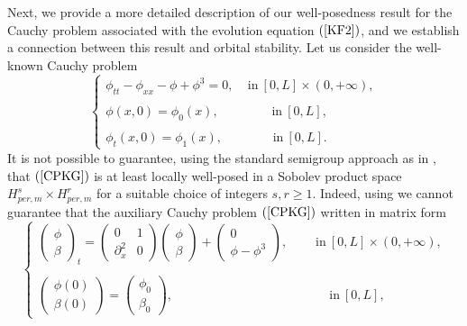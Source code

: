 \documentclass[12pt,reqno,a4paper]{amsart} %
\numberwithin{equation}{section}
\numberwithin{figure}{section}
\begin{document}
\indent Next, we provide a more detailed description of our well-posedness result for the Cauchy problem associated with the evolution equation $(\ref{KF2})$, and we establish a connection between this result and orbital stability.  Let us consider the well-known Cauchy problem
   \begin{equation}\label{CPKG}
\left\{\begin{array}{llll}
\phi_{tt}-\phi_{xx}-\phi+\phi^3=0, \:\:\:\: \:\text{in} \: [0,L]\times(0,+\infty), \\\\
\phi(x,0)=\phi_0(x),\:\:\:\:\:\:\:\:\:\:\:\:\:\:\:\:\:\:\: \text{in} \: [0,L],\\\\
\phi_t(x,0)= \phi_1(x),\:\:\:\:\:\:\:\:\:\:\:\:\:\:\:\:\:\: \text{in} \: [0,L].
\end{array}\right.
\end{equation}
It is not possible to guarantee, using the standard semigroup approach as in \cite{pazy}, that $(\ref{CPKG})$ is at least locally well-posed in a Sobolev product space $H_{per,m}^s\times H_{per,m}^r$ for a suitable choice of integers $s,r\geq1$. Indeed, using \cite{pazy} we cannot guarantee that the auxiliary Cauchy problem 
$(\ref{CPKG})$ written in matrix form 
\begin{equation}\label{CPKG1}
\begin{cases}
	\left(\begin{array}{lll}\phi\\\beta\end{array}\right)_t
	=\left(\begin{array}{lll}0&  1\\ \partial_x^2&  0\end{array}\right)\left(\begin{array}{lll}\phi\\\beta\end{array}\right)+\left(\begin{array}{ccc}0\\ \phi-\phi^3\end{array}\right),\:\:\:\:\:\:\:\:\:\: \text{in} \: [0,L]\times(0,+\infty),\\\\
	\left(\begin{array}{llll}\phi(0)\\\beta(0)\end{array}\right)=\left(\begin{array}{ccc}\phi_0\\ \beta_0\end{array}\right), \:\:\:\:\:\:\:\:\:\:\:\:\:\:\:\:\:\:\:\:\:\:\:\:\:\:\:\:\:\:\:\:\:\:\:\:\:\:\:\:\:\:\:\:\:\:\:\:\:\:\:\:\:\:\:\: \text{in} \: [0,L],
\end{cases}
\end{equation}
\end{document}
